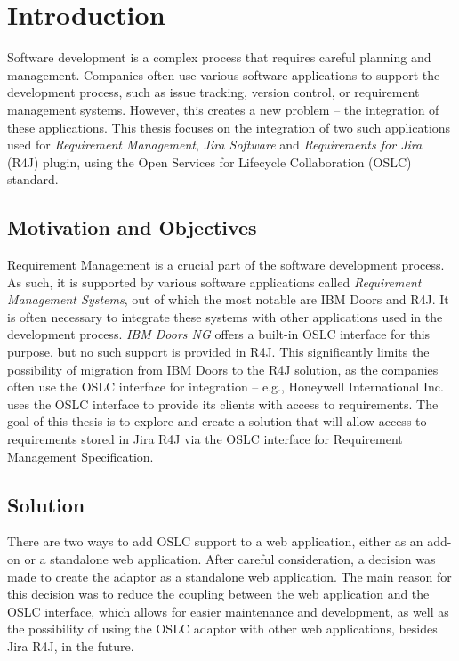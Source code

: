 
% 

\chapter{Introduction}
Software development is a complex process that requires careful planning and management. Companies often use various software applications to support the development process, such as issue tracking, version control, or requirement management systems. However, this creates a new problem -- the integration of these applications. This thesis focuses on the integration of two such applications used for \emph{Requirement Management}, \emph{Jira Software} and \emph{Requirements for Jira} (R4J) plugin, using the Open Services for Lifecycle Collaboration (OSLC) standard.

\section{Motivation and Objectives}
Requirement Management is a crucial part of the software development process. As such, it is supported by various software applications called \emph{Requirement Management Systems}, out of which the most notable are IBM Doors and R4J. It is often necessary to integrate these systems with other applications used in the development process. \emph{IBM Doors NG} offers a built-in OSLC interface for this purpose, but no such support is provided in R4J. This significantly limits the possibility of migration from IBM Doors to the R4J solution, as the companies often use the OSLC interface for integration -- e.g., Honeywell International Inc. uses the OSLC interface to provide its clients with access to requirements. The goal of this thesis is to explore and create a solution that will allow access to requirements stored in Jira R4J via the OSLC interface for Requirement Management Specification.

\section{Solution}
There are two ways to add OSLC support to a web application, either as an add-on or a standalone web application. After careful consideration, a decision was made to create the adaptor as a standalone web application. The main reason for this decision was to reduce the coupling between the web application and the OSLC interface, which allows for easier maintenance and development, as well as the possibility of using the OSLC adaptor with other web applications, besides Jira R4J, in the future. 

